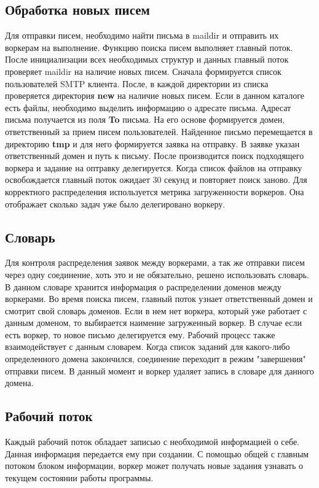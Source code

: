 \documentclass[a4paper,12pt]{report}
\begin{document}
\subsection{Обработка новых писем}
Для отправки писем, необходимо найти письма в maildir и отправить их воркерам на выполнение. Функцию поиска писем выполняет главный поток. После инициализации всех необходимых структур и данных главный поток проверяет maildir на наличие новых писем. Сначала формируется список пользователей SMTP клиента. После, в каждой директории из списка проверяется директория \textbf{new} на наличие новых писем. Если в данном каталоге есть файлы, необходимо выделить информацию о адресате письма. Адресат письма получается из поля \textbf{To} письма. На его основе формируется домен, ответственный за прием писем пользователей. 
Найденное письмо перемещается в директорию \textbf{tmp} и для него формируется заявка на отправку. В заявке указан ответственный домен и путь к письму. После производится поиск подходящего воркера и задание на оптравку делегируется. Когда список файлов на отправку освобождается главный поток ожидает 30 секунд и повторяет поиск заново. Для корректного распределения используется метрика загруженности воркеров. Она отображает сколько задач уже было делегировано воркеру.

\subsection{Словарь}
Для контроля распределения заявок между воркерами, а так же отправки писем через одну соединение, хоть это и не обязательно, решено использовать словарь. В данном словаре хранится информация о распределении доменов между воркерами. Во время поиска писем, главный поток узнает ответственный домен и смотрит свой словарь доменов. Если в нем нет воркера, который уже работает с данным доменом, то выбирается наимение загруженный воркер. В случае если есть воркер, то новое письмо делегируется ему.
Рабочий процесс также взаимодействует с данным словарем. Когда список заданий для какого-либо определенного домена закончился, соединение переходит в режим "завершения" отправки писем. В данный момент и воркер удаляет запись в словаре для данного домена.

\subsection{Рабочий поток}
Каждый рабочий поток обладает записью с необходимой информацией о себе. Данная информация передается ему при создании. С помощью общей с главным потоком блоком информации, воркер может получать новые задания узнавать о текущем состоянии работы программы. 
\end{document}
